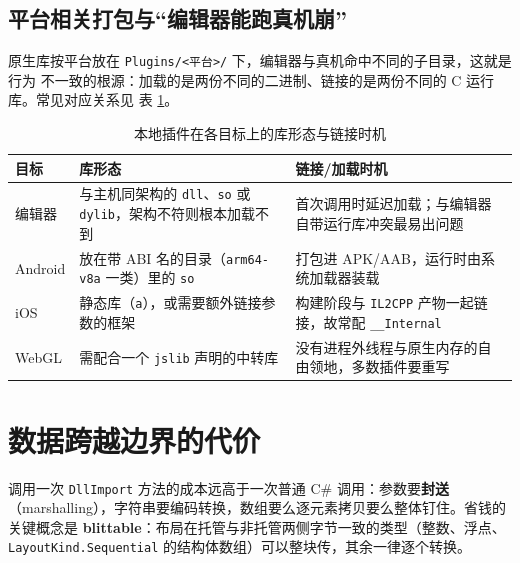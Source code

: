 \documentclass[12pt,a4paper,fontset=fandol]{ctexbook}
\newcommand{\Tp}[1]{\texttt{#1}}
\newcommand{\Bk}{\discretionary{}{}{}}
\newcommand{\Lang}[1]{\textsf{#1}}
\begin{document}
\subsection{平台相关打包与``编辑器能跑真机崩''}
\label{sec:ch11-plugin-packaging}

原生库按平台放在 \Tp{Plugins/{\Bk}\Bk<平台>/} 下，编辑器与真机命中不同的子目录，这就是行为
不一致的根源：加载的是两份不同的二进制、链接的是两份不同的 C 运行库。常见对应关系见
表 \ref{tab:ch11-platform}。

\begin{table}[htbp]
\centering
\caption{本地插件在各目标上的库形态与链接时机}
\label{tab:ch11-platform}
\begin{tabular}{>{\raggedright\arraybackslash}p{} >{\raggedright\arraybackslash}p{} >{\raggedright\arraybackslash}p{}}
\toprule
\textbf{目标} & \textbf{库形态} & \textbf{链接/加载时机} \\
\midrule
编辑器 & 与主机同架构的 \Tp{dll}、\Tp{so} 或 \Tp{dylib}，架构不符则根本加载不到 & 首次调用时延迟加载；与编辑器自带运行库冲突最易出问题 \\
Android & 放在带 ABI 名的目录（\Tp{arm64-v8a} 一类）里的 \Tp{so} & 打包进 APK/AAB，运行时由系统加载器装载 \\
iOS & 静态库（\Tp{a}），或需要额外链接参数的框架 & 构建阶段与 \Tp{IL2CPP} 产物一起链接，故常配 \Tp{\_\_Internal} \\
WebGL & 需配合一个 \Tp{jslib} 声明的中转库 & 没有进程外线程与原生内存的自由领地，多数插件要重写 \\
\bottomrule
\end{tabular}
\end{table}

\section{数据跨越边界的代价}
\label{sec:ch11-marshalling}

调用一次 \Tp{DllImport} 方法的成本远高于一次普通 \Lang{C\#} 调用：参数要\textbf{封送}
（marshalling），字符串要编码转换，数组要么逐元素拷贝要么整体钉住。省钱的关键概念是
\textbf{blittable}：布局在托管与非托管两侧字节一致的类型（整数、浮点、
\Tp{Layout{\Bk}Kind.{\Bk}Sequential} 的结构体数组）可以整块传，其余一律逐个转换。
\end{document}
